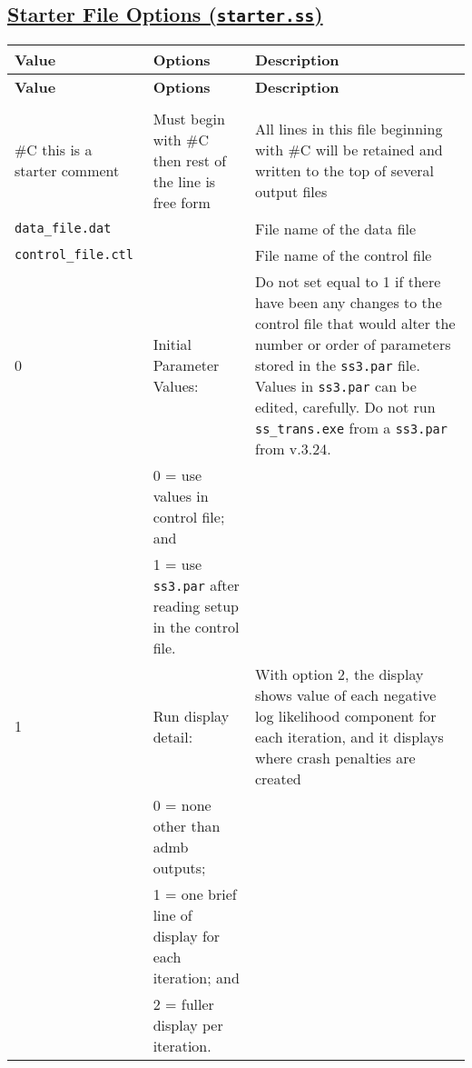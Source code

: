 {
\setlength\extrarowheight{4pt}
\begin{landscape}
\hypertarget{StarterOptions}{}
\subsection[Starter File Options (\texttt{starter.ss})]{\protect\hyperlink{StarterOptions}{Starter File Options (\texttt{starter.ss})}}	

\begin{longtable}{p{1.5cm} p{7.2cm} p{12.3cm}} 

 \hline
 \textbf{Value} & \textbf{Options} & \textbf{Description} \TBstrut\\ 
 \hline
 \endfirsthead
 
 \hline
 \textbf{Value} & \textbf{Options} & \textbf{Description} \TBstrut\\ 
 \hline
 \endhead
 
 \hline
 \endfoot
 
 \hline
 \multicolumn{3}{c}{\textbf{End of Starter File}} \Tstrut\Bstrut\\
 \hline
 \endlastfoot

 \#C this is a starter comment & Must begin with \#C then rest of the line is free form & All lines in this file beginning with \#C will be retained and written to the top of several output files \Tstrut\\
		
 \hline
 \texttt{data\_file.dat} &  & File name of the data file \Tstrut\\
		
 \hline
 \texttt{control\_file.ctl} &  & File name of the control file \Tstrut\\
   
 \hline		
 0 & Initial Parameter Values: & \multirow{1}{1cm}[-0.25cm]{\parbox{12.5cm}{Do not set equal to 1 if there have been any changes to the control file that would alter the number or order of parameters stored in the \texttt{ss3.par} file. Values in \texttt{ss3.par} can be edited, carefully. Do not run \texttt{ss\_trans.exe} from a \texttt{ss3.par} from v.3.24.}}\Tstrut\\
 & 0 = use values in control file; and &  \\
 & 1 = use \texttt{ss3.par} after reading setup in the control file. & \\
		
 \hline
 1 & Run display detail: &  \multirow{1}{1cm}[-0.25cm]{\parbox{12.5cm}{With option 2, the display shows value of each negative log likelihood component for each iteration, and it displays where crash penalties are created}} \Tstrut\\
   & 0 = none other than \gls{admb} outputs; & \\
   & 1 = one brief line of display for each iteration; and & \\
   & 2 = fuller display per iteration. & \\
		  

\end{longtable}
\end{landscape}}
